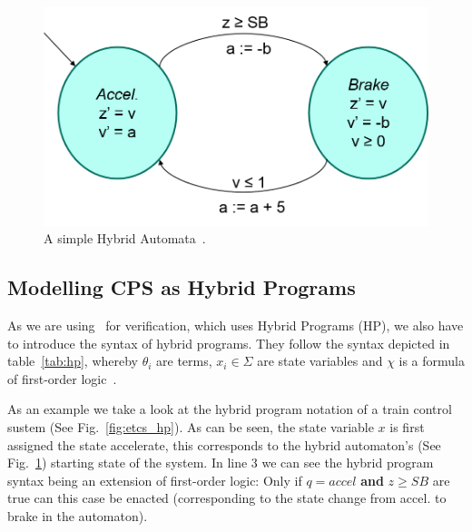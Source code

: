 \begin{figure}[ht!]
	\centering
	\includegraphics[width=1.0\textwidth]{images/automata}
	\caption{A simple Hybrid Automata~\cite{platze2010b}.}
	\label{fig:automata}
\end{figure}

\subsection{Modelling CPS as Hybrid Programs}

As we are using \keym~for verification, which uses Hybrid Programs (HP), we also have to introduce the syntax of hybrid programs. They follow the syntax depicted in table~\ref{tab:hp}, whereby \(\theta_i\) are terms, \(x_i \in \Sigma\) are state variables and \(\chi\) is a formula of first-order logic~\cite{platzer2010b}.

As an example we take a look at the hybrid program notation of a train control sustem (See Fig.~\ref{fig:etcs_hp}). As can be seen, the state variable \(x\) is first assigned the state accelerate, this corresponds to the hybrid automaton's (See Fig.~\ref{fig:automata}) starting state of the system. In line 3 we can see the hybrid program syntax being an extension of first-order logic: Only if \(q=accel\) \textbf{and} \(z \geq SB\) are true can this case be enacted (corresponding to the state change from accel. to brake in the automaton).

